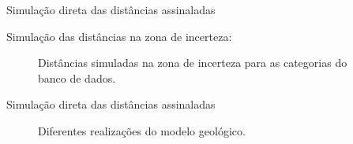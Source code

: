 \documentclass[aspectratio=169]{beamer}
\begin{document}
\begin{frame}{Simulação direta das distâncias assinaladas}

Simulação das distâncias na zona de incerteza:

	\begin{figure}[H] 
		\caption{Distâncias simuladas na zona de incerteza para as categorias do banco de dados.} \label{dist_sim_u}
		\centering
	\end{figure}
\end{frame}

\begin{frame}{Simulação direta das distâncias assinaladas}
	\begin{figure}[H]
		\caption{Diferentes realizações do modelo geológico.} 
		\label{dif_real}
	\end{figure}
\end{frame}
\end{document}
